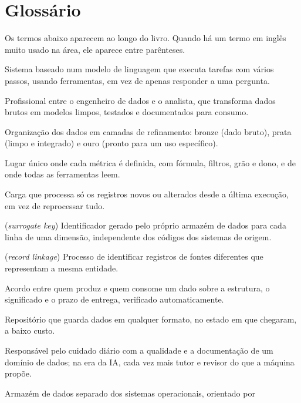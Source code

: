 \chapter{Glossário}
\label{cap:glossario}

Os termos abaixo aparecem ao longo do livro. Quando há um termo em inglês muito usado na área, ele
aparece entre parênteses.

\begin{description}[style=nextline, leftmargin=1.5em, font=\normalfont\scshape]
  \item[Agente de IA] Sistema baseado num modelo de linguagem que executa tarefas com vários
    passos, usando ferramentas, em vez de apenas responder a uma pergunta.
  \item[Analytics engineer] Profissional entre o engenheiro de dados e o analista, que
    transforma dados brutos em modelos limpos, testados e documentados para consumo.
  \item[Arquitetura medalhão] Organização dos dados em camadas de refinamento: bronze (dado
    bruto), prata (limpo e integrado) e ouro (pronto para um uso específico).
  \item[Camada semântica] Lugar único onde cada métrica é definida, com fórmula, filtros, grão e
    dono, e de onde todas as ferramentas leem.
  \item[Carga incremental] Carga que processa só os registros novos ou alterados desde a última
    execução, em vez de reprocessar tudo.
  \item[Chave substituta] (\emph{surrogate key}) Identificador gerado pelo próprio armazém de
    dados para cada linha de uma dimensão, independente dos códigos dos sistemas de origem.
  \item[Conciliação de registros] (\emph{record linkage}) Processo de identificar registros de
    fontes diferentes que representam a mesma entidade.
  \item[Contrato de dados] Acordo entre quem produz e quem consome um dado sobre a estrutura, o
    significado e o prazo de entrega, verificado automaticamente.
  \item[Data lake] Repositório que guarda dados em qualquer formato, no estado em que chegaram,
    a baixo custo.
  \item[Data steward] Responsável pelo cuidado diário com a qualidade e a documentação de um
    domínio de dados; na era da IA, cada vez mais tutor e revisor do que a máquina propõe.
  \item[Data warehouse] Armazém de dados separado dos sistemas operacionais, orientado por

\end{description}
